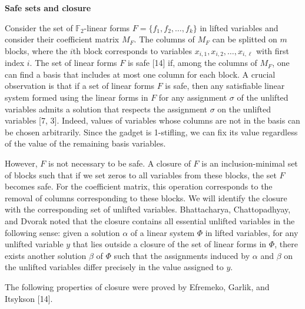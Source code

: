 \par\medskip\noindent\textbf{Safe sets and closure}\par


Consider the set of $\mathbb{F}_{2}$-linear forms $F=\{f_{1},f_{2},\dots,f_{k}\}$ in lifted variables and consider their coefficient matrix $M_{F}$. The columns of $M_{F}$ can be splitted on $m$ blocks, where the $i$th block corresponds to variables $x_{i,1},x_{i,2},\dots,x_{i,\ell}$ with first index $i$.
The set of linear forms $F$ is safe [14] if, among the columns of $M_{F}$, one can find a basis that includes at most one column for each block. A crucial observation is that if a set of linear forms $F$ is safe, then any satisfiable linear system formed using the linear forms in $F$ for any assignment $\sigma$ of the unlifted variables admits a solution that respects the assignment $\sigma$ on the unlifted variables [7, 3].
Indeed, values of variables whose columns are not in the basis can be chosen arbitrarily. Since the gadget is 1-stifling, we can fix its value regardless of the value of the remaining basis variables.\par



However, $F$ is not necessary to be safe. A closure of $F$ is an inclusion-minimal set of blocks such that if we set zeros to all variables from these blocks, the set $F$ becomes safe. For the coefficient matrix, this operation corresponds to the removal of columns corresponding to these blocks. We will identify the closure with the corresponding set of unlifted variables. Bhattacharya, Chattopadhyay, and Dvorak
noted that the closure contains all essential unlifted variables in the following sense:
given a solution $\alpha$ of a linear system $\Phi$ in lifted variables, for any unlifted variable $y$ that lies outside a closure of the set of linear forms in $\Phi$, there exists another solution $\beta$ of $\Phi$ such that the assignments induced by $\alpha$ and $\beta$ on the unlifted variables differ precisely in the value assigned to $y$.\par



The following properties of closure were proved by Efremeko, Garlik, and Itsykson [14].\par


